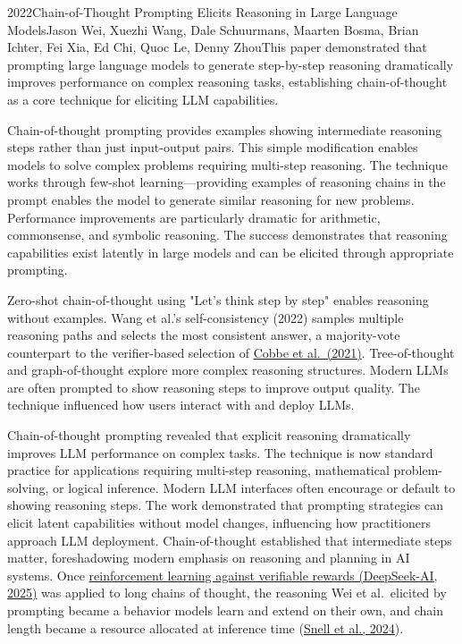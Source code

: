 
\begin{papersummary}{2022}{Chain-of-Thought Prompting Elicits Reasoning in Large Language Models}{Jason Wei, Xuezhi Wang, Dale Schuurmans, Maarten Bosma, Brian Ichter, Fei Xia, Ed Chi, Quoc Le, Denny Zhou}{This paper demonstrated that prompting large language models to generate step-by-step reasoning dramatically improves performance on complex reasoning tasks, establishing chain-of-thought as a core technique for eliciting LLM capabilities.}

Chain-of-thought prompting provides examples showing intermediate reasoning steps rather than just input-output pairs. This simple modification enables models to solve complex problems requiring multi-step reasoning. The technique works through few-shot learning—providing examples of reasoning chains in the prompt enables the model to generate similar reasoning for new problems. Performance improvements are particularly dramatic for arithmetic, commonsense, and symbolic reasoning. The success demonstrates that reasoning capabilities exist latently in large models and can be elicited through appropriate prompting.

Zero-shot chain-of-thought using "Let's think step by step" enables reasoning without examples. Wang et al.'s self-consistency (2022) samples multiple reasoning paths and selects the most consistent answer, a majority-vote counterpart to the verifier-based selection of \hyperref[paper:cobbe-2021-gsm8k]{Cobbe et al.\ (2021)}. Tree-of-thought and graph-of-thought explore more complex reasoning structures. Modern LLMs are often prompted to show reasoning steps to improve output quality. The technique influenced how users interact with and deploy LLMs.

Chain-of-thought prompting revealed that explicit reasoning dramatically improves LLM performance on complex tasks. The technique is now standard practice for applications requiring multi-step reasoning, mathematical problem-solving, or logical inference. Modern LLM interfaces often encourage or default to showing reasoning steps. The work demonstrated that prompting strategies can elicit latent capabilities without model changes, influencing how practitioners approach LLM deployment. Chain-of-thought established that intermediate steps matter, foreshadowing modern emphasis on reasoning and planning in AI systems. Once \hyperref[paper:deepseek-2025-r1]{reinforcement learning against verifiable rewards (DeepSeek-AI, 2025)} was applied to long chains of thought, the reasoning Wei et al.\ elicited by prompting became a behavior models learn and extend on their own, and chain length became a resource allocated at inference time (\hyperref[paper:snell-2024-test-time]{Snell et al., 2024}).

\end{papersummary}
